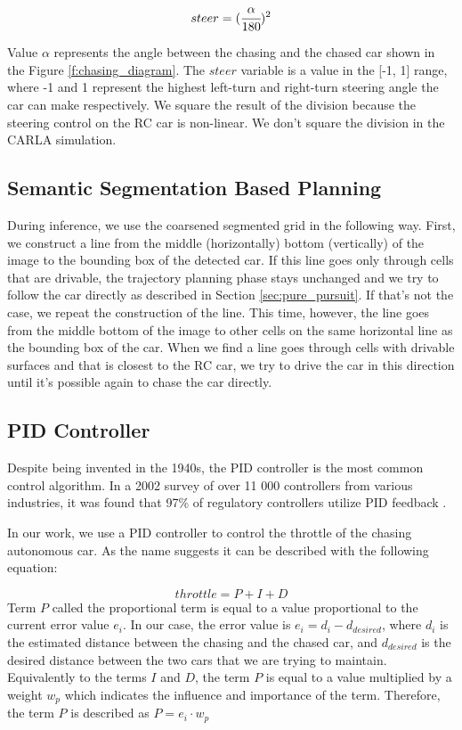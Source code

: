 \documentclass{ctuthesis/ctuthesis}
\begin{document}
\begin{equation}steer = (\cfrac{\alpha}{\textrm{180}})^{2}\end{equation}

Value $\alpha$ represents the angle between the chasing and the chased car shown in the Figure \ref{f:chasing_diagram}. The $steer$ variable is a value in the [-1, 1] range, where -1 and 1 represent the highest left-turn and right-turn steering angle the car can make respectively. We square the result of the division because the steering control on the RC car is non-linear. We don't square the division in the CARLA simulation.




\subsection{Semantic Segmentation Based Planning}
During inference, we use the coarsened segmented grid in the following way. First, we construct a line from the middle (horizontally) bottom (vertically) of the image to the bounding box of the detected car. If this line goes only through cells that are drivable, the trajectory planning phase stays unchanged and we try to follow the car directly as described in Section \ref{sec:pure_pursuit}. If that's not the case, we repeat the construction of the line. This time, however, the line goes from the middle bottom of the image to other cells on the same horizontal line as the bounding box of the car. When we find a line goes through cells with drivable surfaces and that is closest to the RC car, we try to drive the car in this direction until it's possible again to chase the car directly.

\subsection{PID Controller}
Despite being invented in the 1940s, the PID controller is the most common control algorithm. In a 2002 survey of over 11 000 controllers from various industries, it was found that 97\% of regulatory controllers utilize PID feedback \cite{PID-usage}. 

In our work, we use a PID controller to control the throttle of the chasing autonomous car. As the name suggests it can be described with the following equation:

\begin{equation}
throttle = P+I+D    
\end{equation}
Term $P$ called the proportional term is equal to a value proportional to the current error value $e_i$. In our case, the error value is $e_i = d_i - d_{desired}$, where $d_i$ is the estimated distance between the chasing and the chased car, and $d_{desired}$ is the desired distance between the two cars that we are trying to maintain. Equivalently to the terms $I$ and $D$, the term $P$ is equal to a value multiplied by a weight $w_p$ which indicates the influence and importance of the term. Therefore, the term $P$ is described as $P = e_i\cdot w_p$ \par
\end{document}
